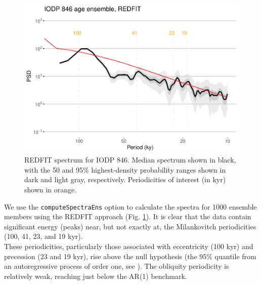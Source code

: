 \documentclass[gchron, manuscript]{copernicus}
\begin{document}
\begin{figure}
\includegraphics[width=12cm]{geoChronR-paper_files/figure-latex/redfit-plot-1} \caption{REDFIT spectrum for IODP 846. Median spectrum shown in black, with the 50 and 95\% highest-density probability ranges shown in dark and light gray, respectively. Periodicities of interest (in kyr) shown in orange.}\label{fig:redfit-plot}
\end{figure}

We use the \texttt{computeSpectraEns} option to calculate the spectra for 1000 ensemble members using the REDFIT approach (Fig. \ref{fig:redfit-plot}). It is clear that the data contain significant energy (peaks) near, but not exactly at, the Milankovitch periodicities (100, 41, 23, and 19 kyr).\\
These periodicities, particularly those associated with eccentricity (100 kyr) and precession (23 and 19 kyr), rise above the null hypothesis (the 95\% quantile from an autoregressive process of order one, see \citet{Mudelsee_NPG09}).
The obliquity periodicity is relatively weak, reaching just below the AR(1) benchmark.
\end{document}
